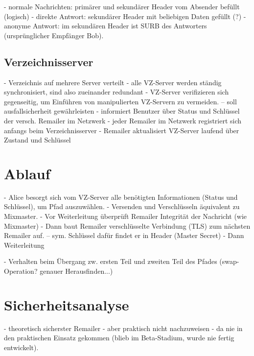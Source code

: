 - normale Nachrichten: primärer und sekundärer Header vom Absender befüllt (logisch)
- direkte Antwort: sekundärer Header mit beliebigen Daten gefüllt (?)
- anonyme Antwort: im sekundären Header ist SURB des Antworters (ursprünglicher Empfänger Bob).

\subsection{Verzeichnisserver}
- Verzeichnis auf mehrere Server verteilt
- alle VZ-Server werden ständig synchronisiert, sind also zueinander redundant
- VZ-Server verifizieren sich gegenseitig, um Einführen von manipulierten VZ-Servern zu vermeiden.
-- soll ausfallsicherheit gewährleisten
- informiert Benutzer über Status und Schlüssel der versch. Remailer im Netzwerk
- jeder Remailer im Netzwerk registriert sich anfangs beim Verzeichnisserver
- Remailer aktualisiert VZ-Server laufend über Zustand und Schlüssel

\section{Ablauf}
- Alice besorgt sich vom VZ-Server alle benötigten Informationen (Status und Schlüssel), um Pfad auszuwählen.
- Versenden und Verschlüsseln äquivalent zu Mixmaster.
- Vor Weiterleitung überprüft Remailer Integrität der Nachricht (wie Mixmaster)
- Dann baut Remailer verschlüsselte Verbindung (TLS) zum nächsten Remailer auf.
-- sym. Schlüssel dafür findet er in Header (Master Secret)
- Dann Weiterleitung

- Verhalten beim Übergang zw. ersten Teil und zweiten Teil des Pfades (swap-Operation? genauer Herausfinden...)


\section{Sicherheitsanalyse}
- theoretisch sicherster Remailer
- aber praktisch nicht nachzuweisen
- da nie in den praktischen Einsatz gekommen (blieb im Beta-Stadium, wurde nie fertig entwickelt).


